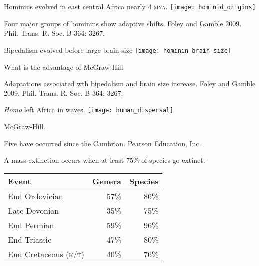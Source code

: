 \documentclass[t]{beamer}
\begin{document}
%
\begin{frame}[t]{Hominins evolved in east central Africa nearly 4 \textsc{mya}.}
	\texttt{[image: hominid\_origins]}
\end{frame}
%
{
\begin{frame}[b]{Four major groups of hominins show adaptive shifts.}
\hfill \tiny \textcopyright Foley and Gamble 2009. Phil. Trans. R. Soc. B 364:  3267.
\end{frame}
}
%
\begin{frame}[t]{Bipedalism evolved before large brain size}
	\texttt{[image: hominin\_brain\_size]}

\end{frame}
%
{
\begin{frame}[b]{What is the advantage of }
\hfill \tiny \textcopyright McGraw-Hill
\end{frame}
}
%
{
\begin{frame}[b]{Adaptations associated wth bipedalism and brain size increase.}
\hfill \tiny \textcopyright Foley and Gamble 2009. Phil. Trans. R. Soc. B 364:  3267.
\end{frame}
}
%
{
\begin{frame}[b]{\textit{Homo} left Africa in waves.}
	\centering
	\texttt{[image: human\_dispersal]}

	\vfilll

	\tiny\hfill \textcopyright McGraw-Hill.
\end{frame}
}
%
{
\begin{frame}[b]{Five  have occurred since the Cambrian.}
\hfill \tiny \textcopyright Pearson Education, Inc.
\end{frame}
}
%
\begin{frame}[t]{A mass extinction occurs when at least 75\% of species go extinct.}
\centering
\begin{tabular}{@{}lrr@{}}
	\toprule
	Event & Genera & Species \\
	\midrule
	End Ordovician	&	57\% & 86\% \\
	Late Devonian & 35\% & 75\% \\
	End Permian	& 59\% & 96\% \\
	End Triassic	& 47\% & 80\% \\
	End Cretaceous (\textsc{k/t}) & 40\% & 76\% \\
	\bottomrule
\end{tabular}

\end{frame}
\end{document}
